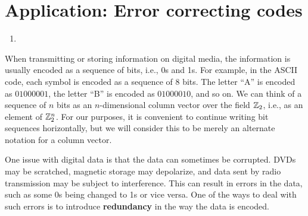 \section{Application: Error correcting codes}

\begin{outcome}
  \begin{enumerate}
  \item 
  \end{enumerate}
\end{outcome}

When transmitting or storing information on digital media, the
information is usually encoded as a sequence of bits, i.e., 0s and 1s.
For example, in the ASCII code, each symbol is encoded as a sequence
of 8 bits. The letter ``A'' is encoded as $01000001$, the letter ``B''
is encoded as $01000010$, and so on. We can think of a sequence of $n$
bits as an $n$-dimensional column vector over the field $\mathbb{Z}_2$, i.e.,
as an element of $\mathbb{Z}_2^n$. For our purposes, it is convenient to
continue writing bit sequences horizontally, but we will consider this
to be merely an alternate notation for a column vector.

One issue with digital data is that the data can sometimes be
corrupted. DVDs may be scratched, magnetic storage may depolarize, and
data sent by radio transmission may be subject to interference. This
can result in errors in the data, such as some 0s being changed to 1s
or vice versa. One of the ways to deal with such errors is to
introduce \textbf{redundancy}%
 in the way the data is encoded.

